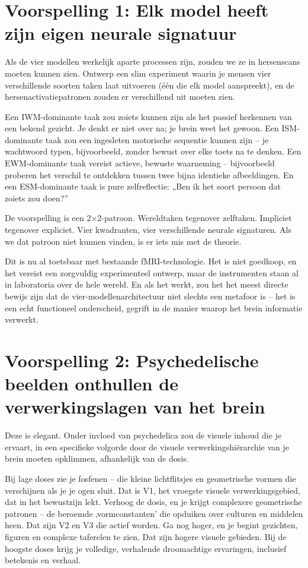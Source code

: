 \documentclass[11pt, twoside, openright]{book}
\begin{document}
\section*{Voorspelling 1: Elk model heeft zijn eigen neurale signatuur}

Als de vier modellen werkelijk aparte processen zijn, zouden we ze in hersenscans moeten kunnen zien. Ontwerp een slim experiment waarin je mensen vier verschillende soorten taken laat uitvoeren (één die elk model aanspreekt), en de hersenactivatiepatronen zouden er verschillend uit moeten zien.

Een IWM-dominante taak zou zoiets kunnen zijn als het passief herkennen van een bekend gezicht. Je denkt er niet over na; je brein weet het gewoon. Een ISM-dominante taak zou een ingesleten motorische sequentie kunnen zijn -- je wachtwoord typen, bijvoorbeeld, zonder bewust over elke toets na te denken. Een EWM-dominante taak vereist actieve, bewuste waarneming -- bijvoorbeeld proberen het verschil te ontdekken tussen twee bijna identieke afbeeldingen. En een ESM-dominante taak is pure zelfreflectie: „Ben ik het soort persoon dat zoiets zou doen?”

De voorspelling is een 2×2-patroon. Wereldtaken tegenover zelftaken. Impliciet tegenover expliciet. Vier kwadranten, vier verschillende neurale signaturen. Als we dat patroon niet kunnen vinden, is er iets mis met de theorie.

Dit is nu al toetsbaar met bestaande fMRI-technologie. Het is niet goedkoop, en het vereist een zorgvuldig experimenteel ontwerp, maar de instrumenten staan al in laboratoria over de hele wereld. En als het werkt, zou het het meest directe bewijs zijn dat de vier-modellenarchitectuur niet slechts een metafoor is -- het is een echt functioneel onderscheid, gegrift in de manier waarop het brein informatie verwerkt.

\section*{Voorspelling 2: Psychedelische beelden onthullen de verwerkingslagen van het brein}

Deze is elegant. Onder invloed van psychedelica zou de visuele inhoud die je ervaart, in een specifieke volgorde door de visuele verwerkingshiërarchie van je brein moeten opklimmen, afhankelijk van de dosis.

Bij lage doses zie je fosfenen -- die kleine lichtflitsjes en geometrische vormen die verschijnen als je je ogen sluit. Dat is V1, het vroegste visuele verwerkingsgebied, dat in het bewustzijn lekt. Verhoog de dosis, en je krijgt complexere geometrische patronen -- de beroemde ‚vormconstanten' die opduiken over culturen en middelen heen. Dat zijn V2 en V3 die actief worden. Ga nog hoger, en je begint gezichten, figuren en complexe taferelen te zien. Dat zijn hogere visuele gebieden. Bij de hoogste doses krijg je volledige, verhalende droomachtige ervaringen, inclusief betekenis en verhaal.
\end{document}
